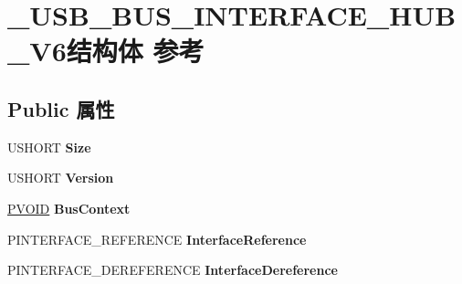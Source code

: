 \hypertarget{struct___u_s_b___b_u_s___i_n_t_e_r_f_a_c_e___h_u_b___v6}{}\section{\+\_\+\+U\+S\+B\+\_\+\+B\+U\+S\+\_\+\+I\+N\+T\+E\+R\+F\+A\+C\+E\+\_\+\+H\+U\+B\+\_\+\+V6结构体 参考}
\label{struct___u_s_b___b_u_s___i_n_t_e_r_f_a_c_e___h_u_b___v6}
\subsection*{Public 属性}
\begin{DoxyCompactItemize}
\item 
\mbox{\label{struct___u_s_b___b_u_s___i_n_t_e_r_f_a_c_e___h_u_b___v6_a726556df24b44b01296fab81f0c4b4ec}} 
U\+S\+H\+O\+RT {\bfseries Size}
\item 
\mbox{\label{struct___u_s_b___b_u_s___i_n_t_e_r_f_a_c_e___h_u_b___v6_aec17ed0d1d646dd36510cec253daf2dd}} 
U\+S\+H\+O\+RT {\bfseries Version}
\item 
\mbox{\label{struct___u_s_b___b_u_s___i_n_t_e_r_f_a_c_e___h_u_b___v6_aff234dd2a4bc860cbb58e167f67d3031}} 
\hyperlink{interfacevoid}{P\+V\+O\+ID} {\bfseries Bus\+Context}
\item 
\mbox{\label{struct___u_s_b___b_u_s___i_n_t_e_r_f_a_c_e___h_u_b___v6_abea0814b4c1e346502537e3bfcd965de}} 
P\+I\+N\+T\+E\+R\+F\+A\+C\+E\+\_\+\+R\+E\+F\+E\+R\+E\+N\+CE {\bfseries Interface\+Reference}
\item 
\mbox{\label{struct___u_s_b___b_u_s___i_n_t_e_r_f_a_c_e___h_u_b___v6_a7f65c3e9b1997c685e4cfe8f0cf5495d}} 
P\+I\+N\+T\+E\+R\+F\+A\+C\+E\+\_\+\+D\+E\+R\+E\+F\+E\+R\+E\+N\+CE {\bfseries Interface\+Dereference}
\item 
\mbox{\label{struct___u_s_b___b_u_s___i_n_t_e_r_f_a_c_e___h_u_b___v6_a1965accd7536fdce4b37075f6cfae150}} 

\end{DoxyCompactItemize}
